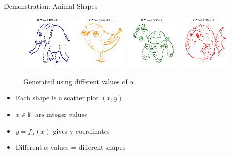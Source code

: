 \documentclass[10pt]{beamer}
\begin{document}
\begin{frame}{Demonstration: Animal Shapes}
\begin{figure}
\includegraphics[width=0.24\textwidth]{fig/note01/elephant.png}
\includegraphics[width=0.24\textwidth]{fig/note01/bird.png}
\includegraphics[width=0.24\textwidth]{fig/note01/turtle.png}
\includegraphics[width=0.24\textwidth]{fig/note01/fish.png}
\caption{Generated using different values of $\alpha$}
\end{figure}

\begin{itemize}
\item Each shape is a scatter plot $(x,y)$
\item $x \in \mathbb{N}$ are integer values
\item $y = f_\alpha(x)$ gives y-coordinates
\item Different $\alpha$ values = different shapes
\end{itemize}
\end{frame}
\end{document}
